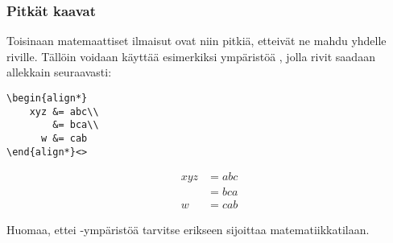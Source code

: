 \begin{fframe}
    \frametitle{Pitkät kaavat}
    Toisinaan matemaattiset ilmaisut ovat niin pitkiä, etteivät ne mahdu yhdelle riville. Tällöin voidaan käyttää esimerkiksi ympäristöä , jolla rivit saadaan allekkain seuraavasti:

    \begin{minipage}{4cm}
        \begin{lstlisting} 
\begin{align*}
    xyz &= abc\\
        &= bca\\
      w &= cab
\end{align*}<>
        \end{lstlisting}
    \end{minipage}
    \begin{minipage}{4cm}
        \begin{serif}
            \begin{align*}
                xyz &= abc\\
                    &= bca\\
                  w &= cab
            \end{align*}
        \end{serif}
    \end{minipage}

    Huomaa, ettei -ympäristöä tarvitse erikseen sijoittaa matematiikkatilaan.
\end{fframe}

